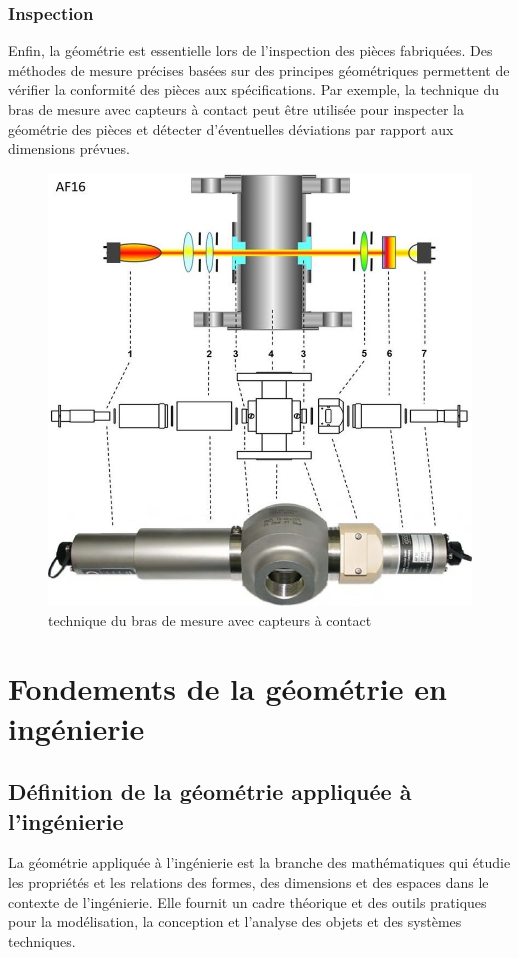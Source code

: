 \documentclass{article}
\begin{document}
\subsubsection{Inspection}
Enfin, la géométrie est essentielle lors de l'inspection des pièces fabriquées. Des méthodes de mesure précises basées sur des principes géométriques permettent de vérifier la conformité des pièces aux spécifications. Par exemple, la technique du bras de mesure avec capteurs à contact peut être utilisée pour inspecter la géométrie des pièces et détecter d'éventuelles déviations par rapport aux dimensions prévues.
\begin{figure}[H]
  \centering
  \includegraphics[width =\textwidth]{capteur.jpg}
  \caption{technique du bras de mesure avec capteurs à contact}
  
\end{figure}



\section{Fondements de la géométrie en ingénierie}

\subsection{Définition de la géométrie appliquée à l'ingénierie}
La géométrie appliquée à l'ingénierie est la branche des mathématiques qui étudie les propriétés et les relations des formes, des dimensions et des espaces dans le contexte de l'ingénierie. Elle fournit un cadre théorique et des outils pratiques pour la modélisation, la conception et l'analyse des objets et des systèmes techniques.
\end{document}
